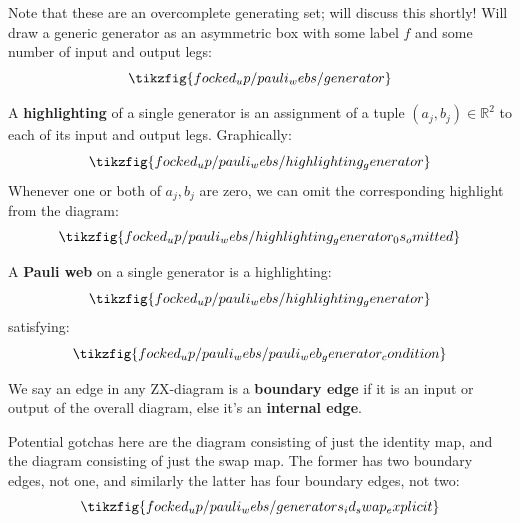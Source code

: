 Note that these are an overcomplete generating set; will discuss this shortly!
Will draw a generic generator as an asymmetric box with some label $f$ and some number of input and output legs:
\begin{equation}\label{eq:generic_generator}
\tikzfig{focked_up/pauli_webs/generator}
\end{equation}

\begin{definition}\label{defn:highlighting_generator}
A \textbf{highlighting} of a single generator is an assignment of a tuple $(a_j, b_j) \in \mathbb{R}^2$ to each of its input and output legs.
Graphically:
\begin{equation}\label{eq:highlighting_generator}
\tikzfig{focked_up/pauli_webs/highlighting_generator}
\end{equation}
Whenever one or both of $a_j, b_j$ are zero, we can omit the corresponding highlight from the diagram:
\begin{equation}\label{eq:highlighting_generator_0s_omitted}
\tikzfig{focked_up/pauli_webs/highlighting_generator_0s_omitted}
\end{equation}
\end{definition}

\begin{definition}\label{defn:pauli_web_generator}
A \textbf{Pauli web} on a single generator is a highlighting:
\begin{equation}\label{eq:pauli_web_generator_highlighting}
\tikzfig{focked_up/pauli_webs/highlighting_generator}
\end{equation}
satisfying:
\begin{equation}\label{eq:pauli_web_generator_condition}
\tikzfig{focked_up/pauli_webs/pauli_web_generator_condition}
\end{equation}
\end{definition}

\begin{definition}\label{defn:boundary_internal_edges}
We say an edge in any ZX-diagram is a \textbf{boundary edge} if it is an input or output of the overall diagram, else it's an \textbf{internal edge}.
\end{definition}

Potential gotchas here are the diagram consisting of just the identity map, and the diagram consisting of just the swap map.
The former has two boundary edges, not one, and similarly the latter has four boundary edges, not two:
\begin{equation}\label{eq:generators_id_swap_explicit_boundary_edges}
\tikzfig{focked_up/pauli_webs/generators_id_swap_explicit}
\end{equation}


